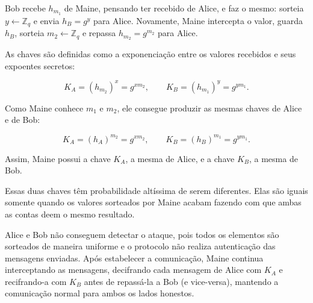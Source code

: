 \documentclass[11pt,a4paper]{article}
\newcommand{\Z}{\mathbb{Z}}
\begin{document}
    Bob recebe $h_{m_1}$ de Maine, pensando ter recebido de Alice, e faz o mesmo: sorteia $y \leftarrow \Z_q$
    e envia $h_B = g^y$ para Alice.
    Novamente, Maine intercepta o valor, guarda $h_B$, sorteia $m_2 \leftarrow \Z_q$ e repassa $h_{m_2} = g^{m_2}$ para Alice.

    As chaves são definidas como a exponenciação entre os valores recebidos e seus expoentes secretos:

    \[
        K_A = (h_{m_2})^{x} = g^{x m_2}, \qquad K_B = (h_{m_1})^{y} = g^{y m_1}.
    \]

    Como Maine conhece $m_1$ e $m_2$, ele consegue produzir as mesmas chaves de Alice e de Bob:

    \[
        K_A = (h_A)^{m_2} = g^{x m_2}, \qquad K_B = (h_B)^{m_1} = g^{y m_1}.
    \]

    Assim, Maine possui a chave $K_A$, a mesma de Alice, e a chave $K_B$, a mesma de Bob.

    Essas duas chaves têm probabilidade altíssima de serem diferentes.
    Elas são iguais somente quando os valores sorteados por Maine acabam fazendo com que ambas as contas deem o mesmo resultado.

    Alice e Bob não conseguem detectar o ataque, pois todos os elementos são sorteados de maneira uniforme
    e o protocolo não realiza autenticação das mensagens enviadas.
    Após estabelecer a comunicação, Maine continua interceptando as mensagens, decifrando cada mensagem de
    Alice com $K_A$ e recifrando-a com $K_B$ antes de repassá-la a Bob (e vice-versa), mantendo a
    comunicação normal para ambos os lados honestos.

    \begin{center}
    \end{center}
\end{document}
